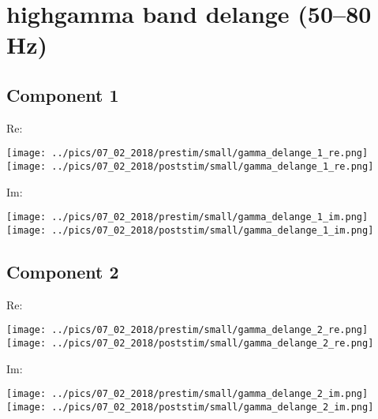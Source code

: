 \documentclass{article}
\begin{document}
\section{highgamma band delange (50--80 Hz)}
\subsection*{Component 1}
Re:

\hspace{2cm}
\texttt{[image: ../pics/07\_02\_2018/prestim/small/gamma\_delange\_1\_re.png]}
\hspace{2cm}
\texttt{[image: ../pics/07\_02\_2018/poststim/small/gamma\_delange\_1\_re.png]}

Im:

\hspace{2cm}
\texttt{[image: ../pics/07\_02\_2018/prestim/small/gamma\_delange\_1\_im.png]}
\hspace{2cm}
\texttt{[image: ../pics/07\_02\_2018/poststim/small/gamma\_delange\_1\_im.png]}

\subsection*{Component 2}
Re:

\hspace{2cm}
\texttt{[image: ../pics/07\_02\_2018/prestim/small/gamma\_delange\_2\_re.png]}
\hspace{2cm}
\texttt{[image: ../pics/07\_02\_2018/poststim/small/gamma\_delange\_2\_re.png]}

Im:

\hspace{2cm}
\texttt{[image: ../pics/07\_02\_2018/prestim/small/gamma\_delange\_2\_im.png]}
\hspace{2cm}
\texttt{[image: ../pics/07\_02\_2018/poststim/small/gamma\_delange\_2\_im.png]}

\end{document}
